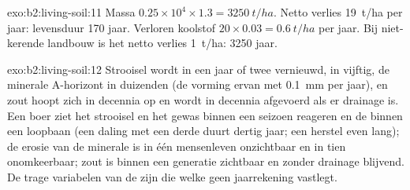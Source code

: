 \begin{solution}{exo:b2:living-soil:11}
Massa $0.25\times 10^{4}\times 1.3 = \qty{3250}{t/ha}$. Netto verlies
\qty{19}{t/ha} per jaar: levensduur 170 jaar. Verloren koolstof $20\times
0.03 = \qty{0.6}{t/ha}$ per jaar. Bij niet-kerende landbouw is het netto verlies
\qty{1}{t/ha}: 3250 jaar.
\end{solution}

\begin{solution}{exo:b2:living-soil:12}
Strooisel wordt in een jaar of twee vernieuwd,  in vijftig, de minerale
A-horizont in duizenden (de vorming ervan met \qty{0.1}{mm} per jaar), en
zout hoopt zich in decennia op en wordt in decennia afgevoerd als er
drainage is. Een boer ziet het strooisel en het gewas binnen een seizoen
reageren en de  binnen een loopbaan (een daling met een derde duurt
dertig jaar; een herstel even lang); de erosie van de minerale 
is in één mensenleven onzichtbaar en in tien onomkeerbaar; zout is
binnen een generatie zichtbaar en zonder drainage blijvend. De trage
variabelen van de  zijn die welke geen jaarrekening vastlegt.
\end{solution}

